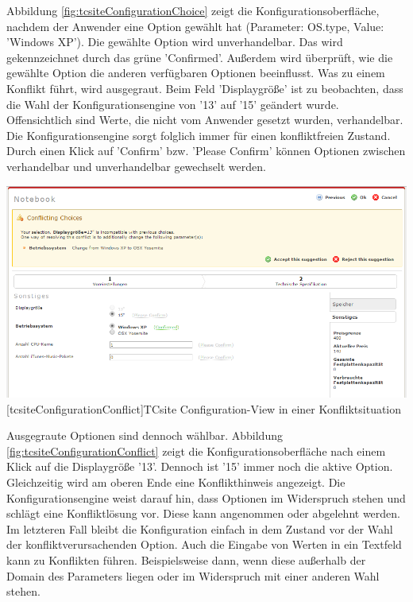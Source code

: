 \documentclass[12pt,a4paper,bibliography=totocnumbered,listof=totoc]{scrartcl}
\begin{document}
Abbildung \ref{fig:tcsiteConfigurationChoice} zeigt die Konfigurationsoberfläche, nachdem der Anwender eine Option gewählt hat (Parameter: OS.type, Value: 'Windows XP'). Die gewählte Option wird \glqq unverhandelbar\grqq{}. Das wird gekennzeichnet durch das grüne 'Confirmed'. Außerdem wird überprüft, wie die gewählte Option die anderen verfügbaren Optionen beeinflusst. Was zu einem Konflikt führt, wird ausgegraut. Beim Feld 'Displaygröße' ist zu beobachten, dass die Wahl der Konfigurationsengine von '13' auf '15' geändert wurde. Offensichtlich sind Werte, die nicht vom Anwender gesetzt wurden, \glqq verhandelbar\grqq{}. Die Konfigurationsengine sorgt folglich immer für einen konfliktfreien Zustand. Durch einen Klick auf 'Confirm' bzw. 'Please Confirm' können Optionen zwischen verhandelbar und unverhandelbar gewechselt werden.

\vspace{1em}
\begin{minipage}{\linewidth}
	\centering
	\includegraphics[width=0.8\linewidth]{Abbildungen/tcsiteConfigurationConflict.PNG}
	[tcsiteConfigurationConflict]{TCsite Configuration-View in einer Konfliktsituation}
	\label{fig:tcsiteConfigurationConflict}
\end{minipage}
\vspace{1em}

Ausgegraute Optionen sind dennoch wählbar. Abbildung \ref{fig:tcsiteConfigurationConflict} zeigt die Konfigurationsoberfläche nach einem Klick auf die Displaygröße '13'. Dennoch ist '15' immer noch die aktive Option. Gleichzeitig wird am oberen Ende eine Konflikthinweis angezeigt. Die Konfigurationsengine weist darauf hin, dass Optionen im Widerspruch stehen und schlägt eine Konfliktlösung vor. Diese kann angenommen oder abgelehnt werden. Im letzteren Fall bleibt die Konfiguration einfach in dem Zustand vor der Wahl der konfliktverursachenden Option. Auch die Eingabe von Werten in ein Textfeld kann zu Konflikten führen. Beispielsweise dann, wenn diese außerhalb der Domain des Parameters liegen oder im Widerspruch mit einer anderen Wahl stehen. 
\end{document}
